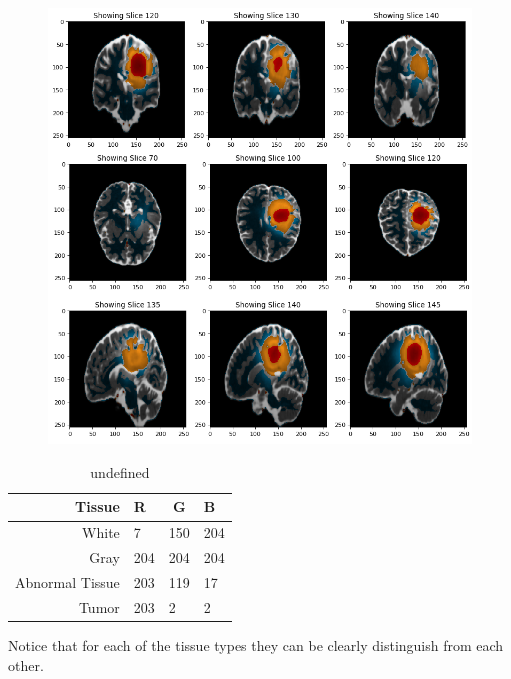 \begin{figure}[H]
  \centering
  \includegraphics[width=\linewidth]{img/colourCodedRegions.png}
  \caption{}
  \label{fig:colourCodedRegions}
\end{figure}

\begin{table}[h]
\centering
\begin{tabular}{|r|l|l|l|}
\hline
Tissue & R & \multicolumn{1}{c|}{G} & B \\ \hline
White & 7 & \multicolumn{1}{c|}{150} & 204 \\ \hline
Gray & 204 & 204 & 204 \\ \hline
Abnormal Tissue & 203 & 119 & 17 \\ \hline
Tumor & 203 & 2 & 2 \\ \hline
\end{tabular}
\caption{undefined}
\label{undefined}
\end{table}

Notice that for each of the tissue types they can be clearly distinguish from each other. 
